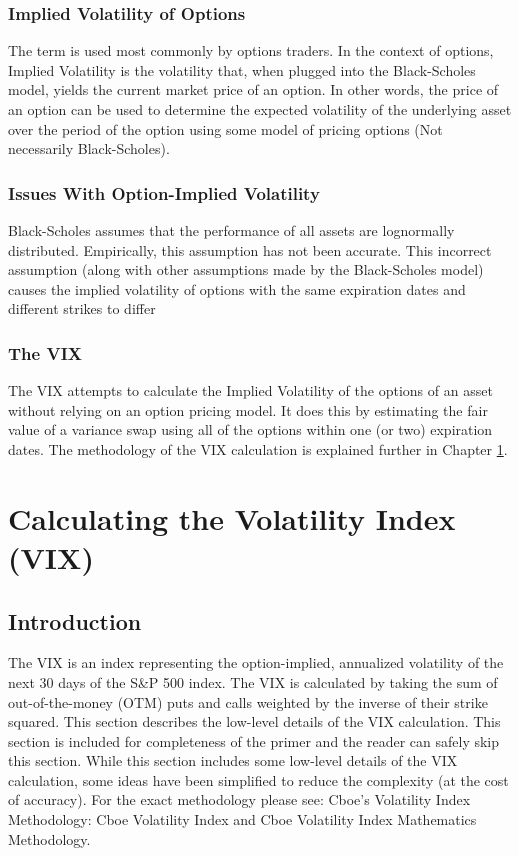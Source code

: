 \documentclass[11pt, oneside]{book}
\begin{document}
\subsection{Implied Volatility of Options} \label{Define-IV-Options}
The term is used most commonly by options traders. In the context of options, Implied Volatility is the volatility that, when plugged into the Black-Scholes model, yields the current market price of an option. In other words, the price of an option can be used to determine the expected volatility of the underlying asset over the period of the option using some model of pricing options (Not necessarily Black-Scholes).

\subsection{Issues With Option-Implied Volatility} \label{Define-IV-Issues}
Black-Scholes assumes that the performance of all assets are lognormally distributed. Empirically, this assumption has not been accurate. This incorrect assumption (along with other assumptions made by the Black-Scholes model) causes the implied volatility of options with the same expiration dates and different strikes to differ

\subsection{The VIX}
\label{Define-IV-VIX}
The VIX attempts to calculate the Implied Volatility of the options of an asset without relying on an option pricing model. It does this by estimating the fair value of a variance swap using all of the options within one (or two) expiration dates. The methodology of the VIX calculation is explained further in Chapter \ref{CalcVix}.






\chapter{Calculating the Volatility Index (VIX)} \label{CalcVix}

\section{Introduction} \label{CalcVix-Intro}
The VIX is an index representing the option-implied, annualized volatility of the next 30 days of the S\&P 500 index. The VIX is calculated by taking the sum of out-of-the-money (OTM) puts and calls weighted by the inverse of their strike squared. This section describes the low-level details of the VIX calculation. This section is included for completeness of the primer and the reader can safely skip this section. While this section includes some low-level details of the VIX calculation, some ideas have been simplified to reduce the complexity (at the cost of accuracy). For the exact methodology please see: Cboe's Volatility Index Methodology: Cboe Volatility Index and Cboe Volatility Index Mathematics Methodology.
\end{document}
